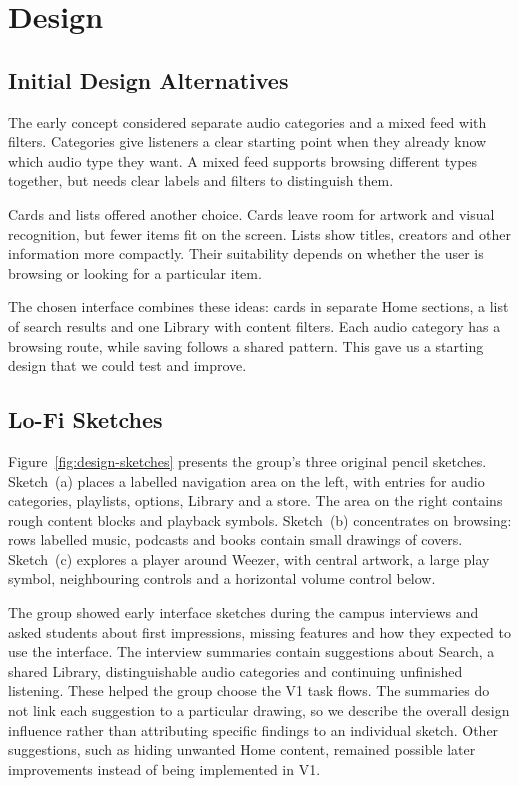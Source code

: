 \chapter{Design}
\label{chap:design}
\section{Initial Design Alternatives}
\label{sec:design-alternatives}

The early concept considered separate audio categories and a mixed feed
with filters. Categories give listeners a clear starting point when they
already know which audio type they want. A mixed feed supports browsing
different types together, but needs clear labels and filters to distinguish
them.

Cards and lists offered another choice. Cards leave room for artwork and
visual recognition, but fewer items fit on the screen. Lists show titles,
creators and other information more compactly. Their suitability depends
on whether the user is browsing or looking for a particular item.

The chosen interface combines these ideas: cards in separate Home sections,
a list of search results and one Library with content filters. Each audio
category has a browsing route, while saving follows a shared pattern.
This gave us a starting design that we could test and improve.

\section{Lo-Fi Sketches}
\label{sec:design-sketches}

Figure~\ref{fig:design-sketches} presents the group's three original pencil
sketches. Sketch~(a) places a labelled navigation area on the left, with
entries for audio categories, playlists, options, Library and a store. The
area on the right contains rough content blocks and playback symbols.
Sketch~(b) concentrates on browsing: rows labelled music, podcasts and books
contain small drawings of covers. Sketch~(c) explores a player around
Weezer, with central artwork, a large play symbol, neighbouring controls and
a horizontal volume control below.

The group showed early interface sketches during the campus interviews and asked students about first impressions, missing features and how they expected to use the interface. The interview summaries contain suggestions about Search, a shared Library, distinguishable audio categories and continuing unfinished listening. These helped the group choose the V1 task flows. The summaries do not link each suggestion to a particular drawing, so we describe the overall design influence rather than attributing specific findings to an individual sketch. Other suggestions, such as hiding unwanted Home content, remained possible later improvements instead of being implemented in V1.


